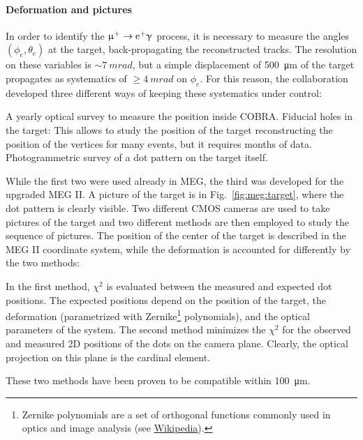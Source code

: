 \begin{refsection}
        \paragraph{Deformation and pictures} In order to identify the $\upmu^+\rightarrow\text{e}^+\upgamma$ process, it is necessary to measure the angles $(\phi_e,\theta_e)$ at the target, back-propagating the reconstructed tracks.
        The resolution on these variables is $\sim\SI{7}{m rad}$, but a simple displacement of \SI{500}{\micro m} of the target propagates as systematics of $\ge \SI{4}{mrad}$ on $\phi_e$.
        For this reason, the collaboration developed three different ways of keeping these systematics under control:
        \begin{outline}
            \1 A yearly optical survey to measure the position inside COBRA.
            \1 Fiducial holes in the target: This allows to study the position of the target reconstructing the position of the vertices for many events, but it requires months of data. 
            \1 Photogrammetric survey of a dot pattern on the target itself.
        \end{outline}
        \noindent
        While the first two were used already in MEG, the third was developed for the upgraded MEG II.
        A picture of the target is in Fig.~\ref{fig:meg:target}, where the dot pattern is clearly visible.
        Two different CMOS cameras are used to take pictures of the target and two different methods are then employed to study the sequence of pictures.
        The position of the center of the target is described in the MEG II coordinate system, while the deformation is accounted for differently by the two methods:
        \begin{outline}
            \1 In the first method, $\chi^2$ is evaluated between the measured and expected dot positions. The expected positions depend on the position of the target, the deformation (parametrized with Zernike\footnote{Zernike polynomials are a set of orthogonal functions commonly used in optics and image analysis (see \href{https://en.wikipedia.org/wiki/Zernike_polynomials}{\underline{Wikipedia}}).} polynomials), and the optical parameters of the system. 
            \1 The second method minimizes the $\chi^2$ for the observed and measured 2D positions of the dots on the camera plane. Clearly, the optical projection on this plane is the cardinal element.
        \end{outline}
        These two methods have been proven to be compatible within \SI{100}{\micro m}.
        

\end{refsection}
